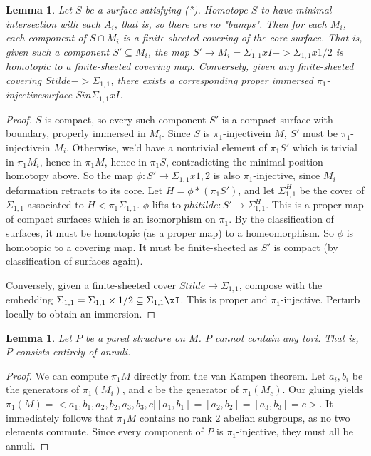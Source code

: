 \documentclass[12pt]{amsart}
\newtheorem{lemma}[theorem]{Lemma}
\theoremstyle{definition}
\newcommand{\x}{\times}
\newcommand{\Si}{\Sigma}
\newcommand{\cin}{\subseteq}
\newcommand{\piinj}{$\pi_1$-injective}
\begin{document}
\begin{lemma}

Let $S$ be a surface satisfying (*). Homotope
$S$ to have minimal intersection with each $A_i$, that is, so there are no "bumps".
Then for each $M_i$, each component of $S \cap M_i$ is a finite-sheeted covering
of the core surface. That is, given such a component $S' \cin M_i$, the map $S'
\to M_i = \Si_{1,1}xI -> \Si_{1,1}x{1/2}$ is homotopic to a finite-sheeted covering
map. Conversely, given any finite-sheeted covering $Stilde -> \Si_{1,1}$, there
exists a corresponding proper immersed \piinj surface $S in \Si_{1,1}xI$.

\end{lemma}
\begin{proof}

$S$ is compact, so every such component $S'$ is a compact surface with
boundary, properly immersed in $M_i$. Since $S$ is \piinj in $M$, $S'$ must be
\piinj in $M_i$. Otherwise, we'd have a nontrivial element of $\pi_1S'$ which
is trivial in $\pi_1M_i$, hence in $\pi_1M$, hence in $\pi_1S$, contradicting the minimal
position homotopy above. So the map $\phi : S'\to\Si_{1,1}x{1,2}$ is also \piinj,
since $M_i$ deformation retracts to its core. Let $H = \phi*(\pi_1S')$, and let
$\Si_{1,1}^H$
be the cover of $\Si_{1,1}$ associated to $H<\pi_1\Si_{1,1}$. $\phi$ lifts to
$phitilde : S'\to
\Si_{1,1}^H$. This is a proper map of compact surfaces which is an isomorphism
on $\pi_1$.
By the classification of surfaces, it must be homotopic (as a proper map) to
a homeomorphism. So $\phi$ is homotopic to a covering map. It must be
finite-sheeted as $S'$ is compact (by classification of surfaces again).

Conversely, given a finite-sheeted cover $Stilde \to \Si_{1,1}$, compose with the
embedding $\Si_{1,1} = \Si_{1,1}\x{1/2} \cin \Si_{1,1}\xI$. This is proper and \piinj.
Perturb locally to obtain an immersion.

\end{proof}

\begin{lemma}

Let $P$ be a pared structure on $M$. $P$ cannot contain any tori. That is,
$P$ consists entirely of annuli.

\end{lemma}
\begin{proof}

We can compute $\pi_1M$ directly from the van Kampen theorem. Let $a_i,b_i$ be
the generators of $\pi_1(M_i)$, and $c$ be the generator of $\pi_1(M_c)$. Our gluing yields
$\pi_1(M) = <a_1,b_1,a_2,b_2,a_3,b_3,c| [a_1,b_1]=[a_2,b_2]=[a_3,b_3]=c>$. It immediately
follows that $\pi_1M$ contains no rank 2 abelian subgroups, as no two elements
commute. Since every component of $P$ is \piinj, they must all be annuli.

\end{proof}
\end{document}
